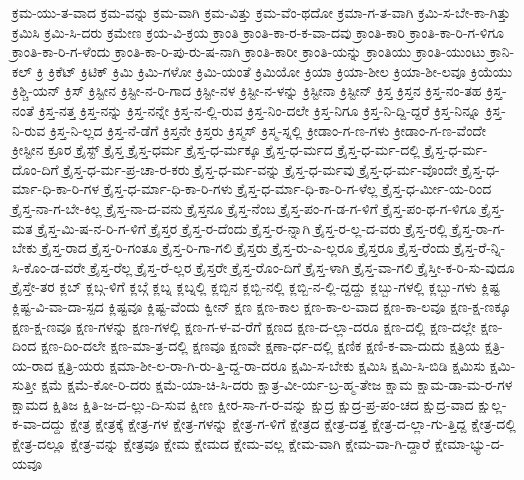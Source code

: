 {ಕ್ರಮ-ಯು-ತ-ವಾದ
ಕ್ರಮ-ವನ್ನು
ಕ್ರಮ-ವಾಗಿ
ಕ್ರಮ-ವಿತ್ತು
ಕ್ರಮ-ವೆಂ-ಥದೋ
ಕ್ರಮಾ-ಗ-ತ-ವಾಗಿ
ಕ್ರಮಿ-ಸ-ಬೇ-ಕಾ-ಗಿತ್ತು
ಕ್ರಮಿಸಿ
ಕ್ರಮಿ-ಸಿ-ದರು
ಕ್ರಮೇಣ
ಕ್ರಯ-ವಿ-ಕ್ರಯ
ಕ್ರಾಂತಿ
ಕ್ರಾಂತಿ-ಕಾ-ರ-ಕ-ವಾ-ದವು
ಕ್ರಾಂತಿ-ಕಾರಿ
ಕ್ರಾಂತಿ-ಕಾ-ರಿ-ಗ-ಳಿಗೂ
ಕ್ರಾಂತಿ-ಕಾ-ರಿ-ಗ-ಳೆಂದು
ಕ್ರಾಂತಿ-ಕಾ-ರಿ-ಪು-ರು-ಷ-ನಾಗಿ
ಕ್ರಾಂತಿ-ಕಾರೀ
ಕ್ರಾಂತಿ-ಯನ್ನು
ಕ್ರಾಂತಿಯು
ಕ್ರಾಂತಿ-ಯುಂಟು
ಕ್ರಾನಿ-ಕಲ್
ಕ್ರಿ
ಕ್ರಿಕೆಟ್
ಕ್ರಿಟಿಕ್
ಕ್ರಿಮಿ
ಕ್ರಿಮಿ-ಗಳೋ
ಕ್ರಿಮಿ-ಯಂತೆ
ಕ್ರಿಮಿಯೋ
ಕ್ರಿಯಾ
ಕ್ರಿಯಾ-ಶೀಲ
ಕ್ರಿಯಾ-ಶೀ-ಲವೂ
ಕ್ರಿಯೆಯು
ಕ್ರಿಶ್ಚಿ-ಯನ್
ಕ್ರಿಸ್
ಕ್ರಿಸ್ಟೀನ
ಕ್ರಿಸ್ಟೀ-ನ-ರಿ-ಗಾದ
ಕ್ರಿಸ್ಟೀ-ನಳ
ಕ್ರಿಸ್ಟೀ-ನ-ಳನ್ನು
ಕ್ರಿಸ್ಟೀನಾ
ಕ್ರಿಸ್ಟೀನ್
ಕ್ರಿಸ್ತ
ಕ್ರಿಸ್ತನ
ಕ್ರಿಸ್ತ-ನಂ-ತಹ
ಕ್ರಿಸ್ತ-ನಂತೆ
ಕ್ರಿಸ್ತ-ನತ್ತ
ಕ್ರಿಸ್ತ-ನನ್ನು
ಕ್ರಿಸ್ತ-ನನ್ನೇ
ಕ್ರಿಸ್ತ-ನ-ಲ್ಲಿ-ರುವ
ಕ್ರಿಸ್ತ-ನಿಂ-ದಲೇ
ಕ್ರಿಸ್ತ-ನಿಗೂ
ಕ್ರಿಸ್ತ-ನಿ-ದ್ದಿ-ದ್ದರೆ
ಕ್ರಿಸ್ತ-ನಿನ್ನೂ
ಕ್ರಿಸ್ತ-ನಿ-ರುವ
ಕ್ರಿಸ್ತ-ನಿ-ಲ್ಲದ
ಕ್ರಿಸ್ತ-ನೆ-ಡೆಗೆ
ಕ್ರಿಸ್ತನೇ
ಕ್ರಿಸ್ತರು
ಕ್ರಿಸ್ಮಸ್
ಕ್ರಿಸ್ಮ-ಸ್ನಲ್ಲಿ
ಕ್ರೀಡಾಂ-ಗ-ಣ-ಗಳು
ಕ್ರೀಡಾಂ-ಗ-ಣ-ವೆಂದೇ
ಕ್ರೀಸ್ಟೀನ
ಕ್ರೂರ
ಕ್ರೈಸ್ಟ್
ಕ್ರೈಸ್ತ
ಕ್ರೈಸ್ತ-ಧರ್ಮ
ಕ್ರೈಸ್ತ-ಧ-ರ್ಮಕ್ಕೂ
ಕ್ರೈಸ್ತ-ಧ-ರ್ಮದ
ಕ್ರೈಸ್ತ-ಧ-ರ್ಮ-ದಲ್ಲಿ
ಕ್ರೈಸ್ತ-ಧ-ರ್ಮ-ದೊಂ-ದಿಗೆ
ಕ್ರೈಸ್ತ-ಧ-ರ್ಮ-ಪ್ರ-ಚಾ-ರ-ಕರು
ಕ್ರೈಸ್ತ-ಧ-ರ್ಮ-ವನ್ನು
ಕ್ರೈಸ್ತ-ಧ-ರ್ಮವು
ಕ್ರೈಸ್ತ-ಧ-ರ್ಮ-ವೊಂದೇ
ಕ್ರೈಸ್ತ-ಧ-ರ್ಮಾ-ಧಿ-ಕಾ-ರಿ-ಗಳ
ಕ್ರೈಸ್ತ-ಧ-ರ್ಮಾ-ಧಿ-ಕಾ-ರಿ-ಗಳು
ಕ್ರೈಸ್ತ-ಧ-ರ್ಮಾ-ಧಿ-ಕಾ-ರಿ-ಗ-ಳೆಲ್ಲ
ಕ್ರೈಸ್ತ-ಧ-ರ್ಮೀ-ಯ-ರಿಂದ
ಕ್ರೈಸ್ತ-ನಾ-ಗ-ಬೇ-ಕಿಲ್ಲ
ಕ್ರೈಸ್ತ-ನಾ-ದ-ವನು
ಕ್ರೈಸ್ತನೂ
ಕ್ರೈಸ್ತ-ನೆಂಬ
ಕ್ರೈಸ್ತ-ಪಂ-ಗ-ಡ-ಗ-ಳಿಗೆ
ಕ್ರೈಸ್ತ-ಪಂ-ಥ-ಗ-ಳಿಗೂ
ಕ್ರೈಸ್ತ-ಮತ
ಕ್ರೈಸ್ತ-ಮಿ-ಷ-ನ-ರಿ-ಗ-ಳಿಗೆ
ಕ್ರೈಸ್ತರ
ಕ್ರೈಸ್ತ-ರ-ದೆಂದು
ಕ್ರೈಸ್ತ-ರ-ನ್ನಾಗಿ
ಕ್ರೈಸ್ತ-ರ-ಲ್ಲ-ದ-ವರು
ಕ್ರೈಸ್ತ-ರಲ್ಲಿ
ಕ್ರೈಸ್ತ-ರಾ-ಗ-ಬೇಕು
ಕ್ರೈಸ್ತ-ರಾದ
ಕ್ರೈಸ್ತ-ರಿ-ಗಂತೂ
ಕ್ರೈಸ್ತ-ರಿ-ಗಾ-ಗಲಿ
ಕ್ರೈಸ್ತರು
ಕ್ರೈಸ್ತ-ರು-ಎ-ಲ್ಲರೂ
ಕ್ರೈಸ್ತರೂ
ಕ್ರೈಸ್ತ-ರೆಂದು
ಕ್ರೈಸ್ತ-ರೆ-ನ್ನಿ-ಸಿ-ಕೊಂ-ಡ-ವರೇ
ಕ್ರೈಸ್ತ-ರೆಲ್ಲ
ಕ್ರೈಸ್ತ-ರೆ-ಲ್ಲರ
ಕ್ರೈಸ್ತರೇ
ಕ್ರೈಸ್ತ-ರೊಂ-ದಿಗೆ
ಕ್ರೈಸ್ತ-ಳಾಗಿ
ಕ್ರೈಸ್ತ-ವಾ-ಗಲಿ
ಕ್ರೈಸ್ತೀ-ಕ-ರಿ-ಸು-ವುದೂ
ಕ್ರೈಸ್ತೇ-ತರ
ಕ್ಲಬ್
ಕ್ಲಬ್ಗ-ಳಿಗೆ
ಕ್ಲಬ್ಗೆ
ಕ್ಲಬ್ನ
ಕ್ಲಬ್ನಲ್ಲಿ
ಕ್ಲಬ್ಬಿನ
ಕ್ಲಬ್ಬಿ-ನಲ್ಲಿ
ಕ್ಲಬ್ಬಿ-ನ-ಲ್ಲಿ-ದ್ದದ್ದು
ಕ್ಲಬ್ಬು-ಗಳಲ್ಲಿ
ಕ್ಲಬ್ಬು-ಗಳು
ಕ್ಲಿಷ್ಟ
ಕ್ಲಿಷ್ಟ-ವಿ-ವಾ-ದಾ-ಸ್ಪದ
ಕ್ಲಿಷ್ಟವೂ
ಕ್ಲಿಷ್ಟ-ವೆಂದು
ಕ್ವೀನ್
ಕ್ಷಣ
ಕ್ಷಣ-ಕಾಲ
ಕ್ಷಣ-ಕಾ-ಲ-ವಾದ
ಕ್ಷಣ-ಕಾ-ಲವೂ
ಕ್ಷಣ-ಕ್ಷ-ಣಕ್ಕೂ
ಕ್ಷಣ-ಕ್ಷ-ಣವೂ
ಕ್ಷಣ-ಗಳನ್ನು
ಕ್ಷಣ-ಗಳಲ್ಲಿ
ಕ್ಷಣ-ಗ-ಳ-ವ-ರೆಗೆ
ಕ್ಷಣದ
ಕ್ಷಣ-ದ-ಲ್ಲಾ-ದರೂ
ಕ್ಷಣ-ದಲ್ಲಿ
ಕ್ಷಣ-ದಲ್ಲೇ
ಕ್ಷಣ-ದಿಂದ
ಕ್ಷಣ-ದಿಂ-ದಲೇ
ಕ್ಷಣ-ಮಾ-ತ್ರ-ದಲ್ಲಿ
ಕ್ಷಣವೂ
ಕ್ಷಣವೇ
ಕ್ಷಣಾ-ರ್ಧ-ದಲ್ಲಿ
ಕ್ಷಣಿಕ
ಕ್ಷಣಿ-ಕ-ವಾ-ದುದು
ಕ್ಷತ್ರಿಯ
ಕ್ಷತ್ರಿ-ಯ-ರಾದ
ಕ್ಷತ್ರಿ-ಯರು
ಕ್ಷಮಾ-ಶೀ-ಲ-ರಾ-ಗಿ-ರು-ತ್ತಿ-ದ್ದ-ರಾ-ದರೂ
ಕ್ಷಮಿ-ಸ-ಬೇಕು
ಕ್ಷಮಿಸಿ
ಕ್ಷಮಿ-ಸಿ-ಬಿಡಿ
ಕ್ಷಮಿಸು
ಕ್ಷಮಿ-ಸುತ್ತೀ
ಕ್ಷಮೆ
ಕ್ಷಮೆ-ಕೋ-ರಿ-ದರು
ಕ್ಷಮೆ-ಯಾ-ಚಿ-ಸಿ-ದರು
ಕ್ಷಾತ್ರ-ವೀ-ರ್ಯ-ಬ್ರ-ಹ್ಮ-ತೇಜ
ಕ್ಷಾಮ
ಕ್ಷಾಮ-ಡಾ-ಮ-ರ-ಗಳ
ಕ್ಷಾಮದ
ಕ್ಷಿತಿಜ
ಕ್ಷಿತಿ-ಜ-ದ-ಲ್ಲು-ದಿ-ಸುವ
ಕ್ಷೀಣ
ಕ್ಷೀರ-ಸಾ-ಗ-ರ-ವನ್ನು
ಕ್ಷುದ್ರ
ಕ್ಷುದ್ರ-ಪ್ರ-ಪಂ-ಚದ
ಕ್ಷುದ್ರ-ವಾದ
ಕ್ಷುಲ್ಲ-ಕ-ವಾ-ದದ್ದು
ಕ್ಷೇತ್ರ
ಕ್ಷೇತ್ರಕ್ಕೆ
ಕ್ಷೇತ್ರ-ಗಳ
ಕ್ಷೇತ್ರ-ಗಳನ್ನು
ಕ್ಷೇತ್ರ-ಗ-ಳಿಗೆ
ಕ್ಷೇತ್ರದ
ಕ್ಷೇತ್ರ-ದತ್ತ
ಕ್ಷೇತ್ರ-ದ-ಲ್ಲಾ-ಗು-ತ್ತಿದ್ದ
ಕ್ಷೇತ್ರ-ದಲ್ಲಿ
ಕ್ಷೇತ್ರ-ದಲ್ಲೂ
ಕ್ಷೇತ್ರ-ವನ್ನು
ಕ್ಷೇತ್ರವೂ
ಕ್ಷೇಮ
ಕ್ಷೇಮದ
ಕ್ಷೇಮ-ವಲ್ಲ
ಕ್ಷೇಮ-ವಾಗಿ
ಕ್ಷೇಮ-ವಾ-ಗಿ-ದ್ದಾರೆ
ಕ್ಷೇಮಾ-ಭ್ಯು-ದ-ಯವೂ
}
